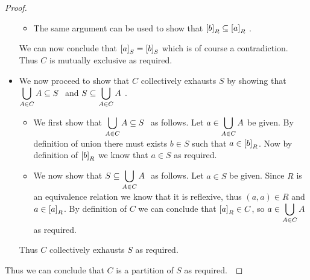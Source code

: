 \begin{proof}
\begin{itemize}
\begin{itemize}
                        \item
                            The same argument can be used to show that $\left[b\right]_{R} \subseteq \left[a\right]_{R} \ $.
                    \end{itemize}
                    We can now conclude that $\left[a\right]_{S} = \left[b\right]_{S}$ which is of course
                    a contradiction. Thus $C$ is mutually exclusive as required.
                \item
                    We now proceed to show that $C$ collectively exhausts $S$ by showing that
                    $\displaystyle\bigcup_{A \in C} A \subseteq S \ $ and $S \subseteq \displaystyle\bigcup_{A \in C} A \ $.
                    \begin{itemize}
                        \item
                            We first show that $\displaystyle\bigcup_{A \in C} A \subseteq S \ $ as follows. 
                            Let $a \in \displaystyle\bigcup_{A \in C} A$ be given. By definition of
                            union there must exists $b \in S$ such that $a \in \left[b\right]_{R}$.
                            Now by definition of $\left[b\right]_{R}$ we know that $a \in S$ as required.
                        \item
                            We now show that $S \subseteq \displaystyle\bigcup_{A \in C} A \ $ as follows. 
                            Let $a \in S$ be given. Since $R$ is an equivalence relation we know
                            that it is reflexive, thus $(a, a) \in R$ and
                            $a \in \left[a\right]_{R}$. By definition of $C$ we can conclude that
                            $\left[a\right]_{R} \in C$, so $a \in \displaystyle\bigcup_{A \in C} A$ as required.
                    \end{itemize}
                    Thus $C$ collectively exhausts $S$ as required.
            \end{itemize}
            Thus we can conclude that $C$ is a partition of $S$ as required.~\QED
        \end{proof}

